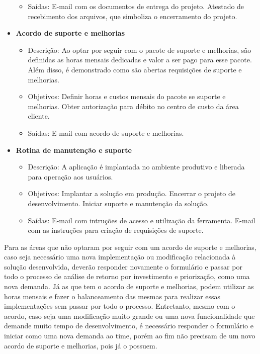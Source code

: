 \begin{itemize}
\begin{itemize}
			\item Saídas: E-mail com os documentos de entrega do projeto. Atestado de recebimento dos arquivos, que simboliza o encerramento do projeto.
		\end{itemize}
		\item \textbf{Acordo de suporte e melhorias}
		\begin{itemize}
			\item Descrição: Ao optar por seguir com o pacote de suporte e melhorias, são definidas as horas mensais dedicadas e valor a ser pago para esse pacote. Além disso, é demonstrado como são abertas requisições de suporte e melhorias.
			\item Objetivos: Definir horas e custos mensais do pacote se suporte e melhorias. Obter autorização para débito no centro de custo da área cliente.
			\item Saídas: E-mail com acordo de suporte e melhorias.
		\end{itemize}
		\item \textbf{Rotina de manutenção e suporte}
		\begin{itemize}
			\item Descrição: A aplicação é implantada no ambiente produtivo e liberada para operação aos usuários.
			\item Objetivos: Implantar a solução em produção. Encerrar o projeto de desenvolvimento. Iniciar suporte e manutenção da solução.
			\item Saídas: E-mail com intruções de acesso e utilização da ferramenta. E-mail com as instruções para criação de requisições de suporte.
		\end{itemize}
	\end{itemize}

	Para as áreas que não optaram por seguir com um acordo de suporte e melhorias, caso seja necessário uma nova implementação ou modificação relacionada à solução desenvolvida, deverão responder novamente o formulário e passar por todo o processo de análise de retorno por investimento e priorização, como uma nova demanda.
	Já as que tem o acordo de suporte e melhorias, podem utilizar as horas mensais e fazer o balanceamento das mesmas para realizar essas implementações sem passar por todo o processo. Entretanto, mesmo com o acordo, caso seja uma modificação muito grande ou uma nova funcionalidade que demande muito tempo de desenvolvimento, é necessário responder o formulário e iniciar como uma nova demanda ao time, porém ao fim não precisam de um novo acordo de suporte e melhorias, pois já o possuem.

